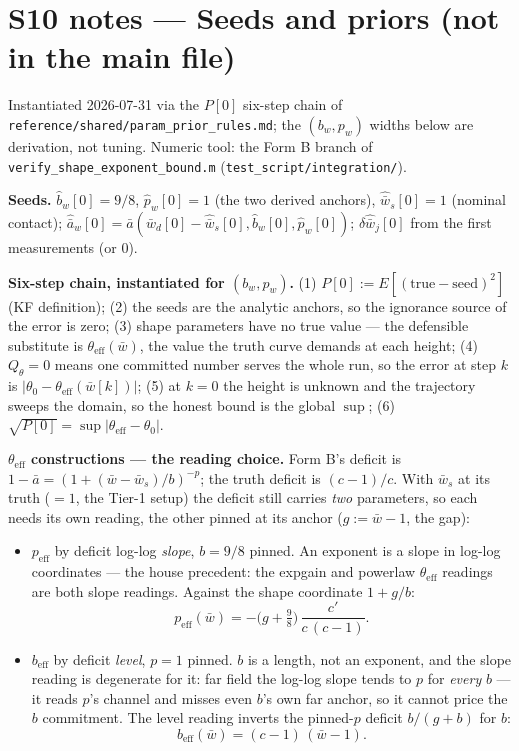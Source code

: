 \documentclass[11pt,a4paper,fontset=none]{ctexart}
\begin{document}
\section*{S10 notes --- Seeds and priors (not in the main file)}

Instantiated 2026-07-31 via the $P[0]$ six-step chain of
\texttt{reference/shared/param\_prior\_rules.md}; the $(b_w, p_w)$ widths
below are derivation, not tuning.  Numeric tool: the Form B branch of
\texttt{verify\_shape\_exponent\_bound.m}
(\texttt{test\_script/integration/}).

\textbf{Seeds.}  $\hat{b}_w[0] = 9/8$, $\hat{p}_w[0] = 1$ (the two derived
anchors), $\hat{\bar{w}}_s[0] = 1$ (nominal contact);
$\hat{\bar{a}}_w[0] = \bar{a}(\bar{w}_d[0]-\hat{\bar{w}}_s[0],
\hat{b}_w[0], \hat{p}_w[0])$; $\delta\hat{\bar{w}}_j[0]$ from the first
measurements (or $0$).

\textbf{Six-step chain, instantiated for $(b_w, p_w)$.}
(1) $P[0] := E[(\text{true}-\text{seed})^2]$ (KF definition);
(2) the seeds are the analytic anchors, so the ignorance source of the
error is zero;
(3) shape parameters have no true value --- the defensible substitute is
$\theta_{\mathrm{eff}}(\bar{w})$, the value the truth curve demands at
each height;
(4) $Q_\theta = 0$ means one committed number serves the whole run, so
the error at step $k$ is $|\theta_0 - \theta_{\mathrm{eff}}(\bar{w}[k])|$;
(5) at $k=0$ the height is unknown and the trajectory sweeps the domain,
so the honest bound is the global $\sup$;
(6) $\sqrt{P[0]} = \sup|\theta_{\mathrm{eff}} - \theta_0|$.

\textbf{$\theta_{\mathrm{eff}}$ constructions --- the reading choice.}
Form B's deficit is $1-\bar{a} = (1+(\bar{w}-\bar{w}_s)/b)^{-p}$; the
truth deficit is $(c-1)/c$.  With $\bar{w}_s$ at its truth ($=1$, the
Tier-1 setup) the deficit still carries \emph{two} parameters, so each
needs its own reading, the other pinned at its anchor
($g := \bar{w}-1$, the gap):
\begin{itemize}
\item $p_{\mathrm{eff}}$ by deficit log-log \emph{slope}, $b = 9/8$
pinned.  An exponent is a slope in log-log coordinates --- the house
precedent: the expgain and powerlaw $\theta_{\mathrm{eff}}$ readings are
both slope readings.  Against the shape coordinate $1+g/b$:
\begin{equation*}
p_{\mathrm{eff}}(\bar{w})
  = -\bigl(g+\tfrac{9}{8}\bigr)\,\frac{c'}{c\,(c-1)} .
\end{equation*}
\item $b_{\mathrm{eff}}$ by deficit \emph{level}, $p = 1$ pinned.  $b$ is
a length, not an exponent, and the slope reading is degenerate for it:
far field the log-log slope tends to $p$ for \emph{every} $b$ --- it
reads $p$'s channel and misses even $b$'s own far anchor, so it cannot
price the $b$ commitment.  The level reading inverts the pinned-$p$
deficit $b/(g+b)$ for $b$:
\begin{equation*}
b_{\mathrm{eff}}(\bar{w}) = (c-1)\,(\bar{w}-1) .
\end{equation*}
\end{itemize}
\end{document}
